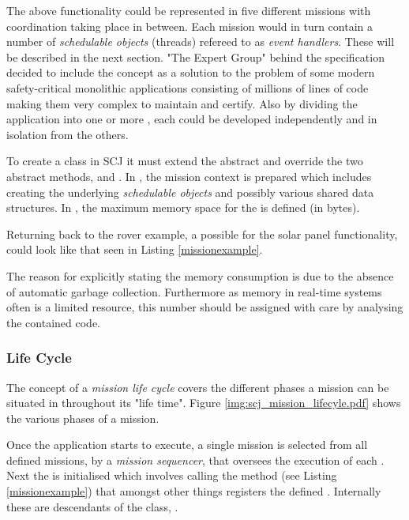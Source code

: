 The above functionality could be represented in five different missions with coordination taking place in between. Each mission would in turn contain a number of \textit{schedulable objects} (threads) refereed to as \textit{event handlers}. These will be described in the next section. "The Expert Group" behind the specification decided to include the  concept as a solution to the problem of some modern safety-critical monolithic applications consisting of millions of lines of code making them very complex to maintain and certify. Also by dividing the application into one or more , each  could be developed independently and in isolation from the others.  

To create a  class in SCJ it must extend the abstract  and override the two abstract methods,  and . In , the mission context is prepared which includes creating the underlying \textit{schedulable objects} and possibly various shared data structures. In , the maximum memory space for the  is defined (in bytes).

Returning back to the rover example, a possible  for the solar panel functionality, could look like that seen in Listing \ref{missionexample}.



The reason for explicitly stating the memory consumption is due to the absence of automatic garbage collection. Furthermore as memory in real-time systems often is a limited resource, this number should be assigned with care by analysing the contained code.

\subsubsection{Life Cycle}
The concept of a \textit{mission life cycle} covers the different phases a mission can be situated in throughout its "life time". Figure \ref{img:scj_mission_lifecyle.pdf} shows the various phases of a mission.


Once the application starts to execute, a single mission is selected from all defined missions, by a \textit{mission sequencer}, that oversees the execution of each . Next the  is initialised which involves calling the  method (see Listing \ref{missionexample}) that amongst other things registers the defined . Internally these are descendants of the class, . 

